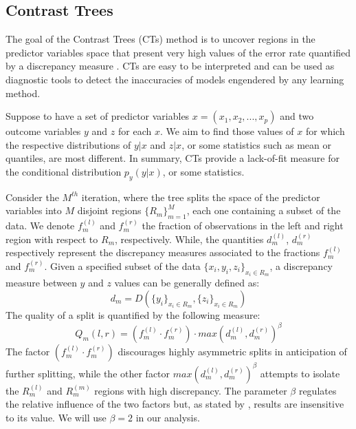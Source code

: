 \documentclass[fleqn,10pt]{wlscirep}
\begin{document}
\subsection*{Contrast Trees}

The goal of the Contrast Trees (CTs) method is to uncover regions in the predictor variables space that present very high values of the error rate quantified by a discrepancy measure \cite{Friedman2020}.
CTs are easy to be interpreted and can be used as diagnostic tools to detect the inaccuracies of models engendered by any learning method. 

Suppose to have a set of predictor variables $x = (x_1, x_2,...,x_p)$ and two outcome variables $y$ and $z$ for each $x$. We aim to find those values of $x$ for which the respective distributions of $y | x$ and $z | x$, or some statistics such as mean or quantiles, are most different. In summary, CTs provide a lack-of-fit measure for the conditional distribution $p_y(y | x)$, or some statistics.

Consider the $M^{th}$ iteration, where the tree splits the space of the predictor variables into $M$ disjoint regions $\lbrace R_m\rbrace^M_{m=1}$, each one containing a subset of the data. We denote $f_m^{(l)}$ and $f_m^{(r)}$ the fraction of observations in the left and right region with respect to $R_m$, respectively. While, the quantities $d_m^{(l)}$, $d_m^{(r)}$ respectively represent the discrepancy measures associated to the fractions $f_m^{(l)}$ and $f_m^{(r)}$. Given a specified subset of the data $\lbrace x_i,y_i,z_i \rbrace_{x_i\in R_m}$, a discrepancy measure between $y$ and $z$ values can be generally defined as:
\begin{equation}
\label{eq:dm}
d_m=D\left( \lbrace y_i\rbrace_{x_i\in R_m},\lbrace z_i\rbrace_{x_i\in R_m}\right)
\end{equation}
The quality of a split is quantified by the following measure:
\begin{equation}
Q_m(l,r)=\left(f_m^{(l)} \cdot f_m^{(r)}\right) \cdot max\left(d_m^{(l)}, d_m^{(r)} \right)^{\beta}
\end{equation}
The factor $\left(f_m^{(l)} \cdot f_m^{(r)}\right)$ discourages highly asymmetric splits in anticipation of further splitting, while the other factor $max\left(d_m^{(l)}, d_m^{(r)} \right)^{\beta}$ attempts to isolate the $R_m^{(l)}$ and $R_m^{(m)}$ regions with high discrepancy. The parameter $\beta$ regulates the relative influence of the two factors but, as stated by \cite{Friedman2020}, results are insensitive to its value. We will use $\beta=2$ in our analysis.
\end{document}
